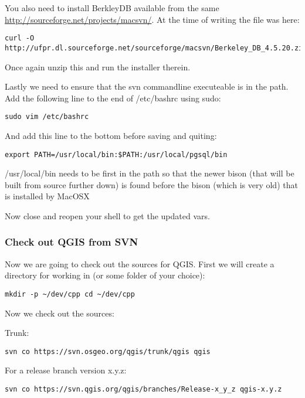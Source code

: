 You also need to install BerkleyDB available from the same
\url{http://sourceforge.net/projects/macsvn/}. At the time of writing the
file was here:

\begin{verbatim}
curl -O http://ufpr.dl.sourceforge.net/sourceforge/macsvn/Berkeley_DB_4.5.20.zip 
\end{verbatim}

Once again unzip this and run the installer therein.

Lastly we need to ensure that the svn commandline executeable is in the path.
Add the following line to the end of /etc/bashrc using sudo:

\begin{verbatim}
sudo vim /etc/bashrc 
\end{verbatim}

And add this line to the bottom before saving and quiting:

\begin{verbatim}
export PATH=/usr/local/bin:$PATH:/usr/local/pgsql/bin 
\end{verbatim}

/usr/local/bin needs to be first in the path so that the newer bison (that will
be built from source further down) is found before the bison (which is very
old) that is installed by MacOSX

Now close and reopen your shell to get the updated vars.

\hypertarget{toc35}{}
\subsubsection{Check out QGIS from SVN}
Now we are going to check out the sources for QGIS. First we will create a
directory for working in (or some folder of your choice):

\begin{verbatim}
mkdir -p ~/dev/cpp cd ~/dev/cpp 
\end{verbatim}

Now we check out the sources:

Trunk:

\begin{verbatim}
svn co https://svn.osgeo.org/qgis/trunk/qgis qgis 
\end{verbatim}

For a release branch version x.y.z:

\begin{verbatim}
svn co https://svn.qgis.org/qgis/branches/Release-x_y_z qgis-x.y.z
\end{verbatim}

